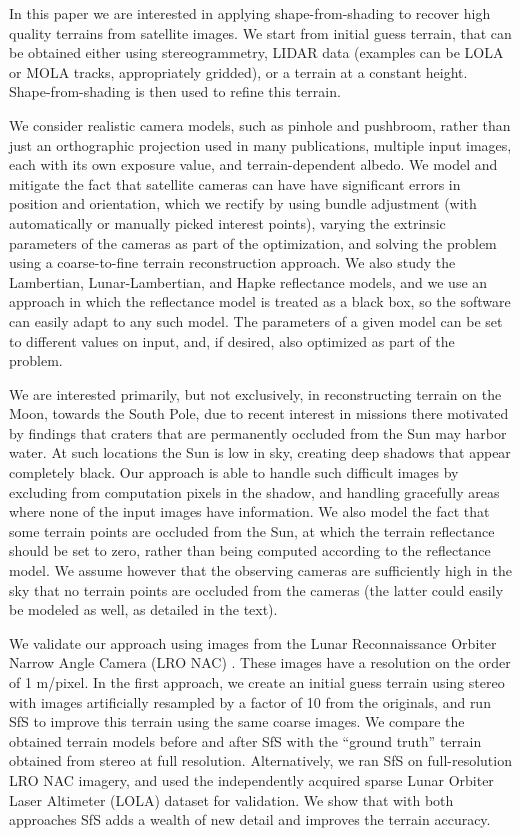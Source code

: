 \documentclass[12pt,oneside]{article}
\begin{document}
In this paper we are interested in applying shape-from-shading to
recover high quality terrains from satellite images. We start from
initial guess terrain, that can be obtained either using
stereogrammetry, LIDAR data (examples can be LOLA or MOLA tracks,
appropriately gridded), or a terrain at a constant height. Shape-from-shading
is then used to refine this terrain.

We consider realistic camera models, such as pinhole and pushbroom,
rather than just an orthographic projection used in many publications,
multiple input images, each with its own exposure value, and
terrain-dependent albedo. We model and mitigate the fact that satellite
cameras can have have significant errors in position and orientation,
which we rectify by using bundle adjustment (with automatically
or manually picked interest points), varying the extrinsic parameters of
the cameras as part of the optimization, and solving the problem using
a coarse-to-fine terrain reconstruction approach.  We also study the
Lambertian, Lunar-Lambertian, and Hapke reflectance models, and we use
an approach in which the reflectance model is treated as a black box, so
the software can easily adapt to any such model. The parameters of a given model
can be set to different values on input, and, if desired, also optimized
as part of the problem. 

We are interested primarily, but not exclusively, in reconstructing
terrain on the Moon, towards the South Pole, due to recent interest in missions
there motivated by findings that craters that are permanently occluded
from the Sun may harbor water. At such locations the Sun is low in
sky, creating deep shadows that appear completely black. Our approach is
able to handle such difficult images by excluding from computation
pixels in the shadow, and handling gracefully areas where none of the
input images have information. We also model the fact that some terrain points are
occluded from the Sun, at which the terrain reflectance should be set to zero,
rather than being computed according to the reflectance model. We assume however that
the observing cameras are sufficiently high in the sky that no terrain
points are occluded from the cameras (the latter could easily be modeled
as well, as detailed in the text).

We validate our approach using images from the Lunar Reconnaissance
Orbiter Narrow Angle Camera (LRO NAC) \cite{robinson2010lunar}. These
images have a resolution on the order of 1 m/pixel.  In the first
approach, we create an initial guess terrain using stereo with images
artificially resampled by a factor of 10 from the originals, and run SfS
to improve this terrain using the same coarse images. We compare the
obtained terrain models before and after SfS with the ``ground truth''
terrain obtained from stereo at full resolution.  Alternatively, we ran
SfS on full-resolution LRO NAC imagery, and used the independently
acquired sparse Lunar Orbiter Laser Altimeter (LOLA) dataset
\cite{smith2010initial} for validation.  We show that with both
approaches SfS adds a wealth of new detail and improves the terrain
accuracy.
\end{document}
